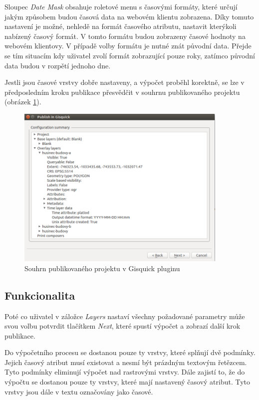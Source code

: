 Sloupec \textit{Date Mask} obsahuje roletové menu s časovými formáty,
které určují jakým způsobem budou časová data na webovém klientu
zobrazena. Díky tomuto nastavení je možné, nehledě na formát časového
atributu, nastavit kterýkoli nabízený časový formát. V tomto formátu
budou zobrazeny časové hodnoty na webovém klientovy. V případě volby
formátu je nutné znát původní data. Přejde se tím situacím kdy
uživatel zvolí formát zobrazující pouze roky, zatímco původní data
budou v rozpětí jednoho dne.

Jestli jsou časové vrstvy dobře nastaveny, a výpočet proběhl korektně,
se lze v předposledním kroku publikace přesvědčit v souhrnu publikovaného
projektu (obrázek \ref{fig:publishing-summary}).

\begin{figure}[h!]
\centering
\includegraphics[width=0.9\textwidth]{../img/project-publishing-time-summary.png}
\caption{Souhrn publikovaného projektu v Gisquick pluginu}
\label{fig:publishing-summary}
\end{figure}

\subsection{Funkcionalita}
\label{sssec:plugin-functionality}

Poté co uživatel v záložce \textit{Layers} nastaví všechny požadované
parametry může svou volbu potvrdit tlačítkem \textit{Next}, které
spustí výpočet a zobrazí další krok publikace.

Do výpočetního procesu se dostanou pouze ty vrstvy, které splňují dvě
podmínky. Jejich časový atribut musí existovat a nesmí být prázdným
textovým řetězcem. Tyto podmínky eliminují výpočet nad rastrovými
vrstvy. Dále zajistí to, že do výpočtu se dostanou pouze ty vrstvy,
které mají nastavený časový atribut. Tyto vrstvy jsou dále v textu
označovány jako časové.

